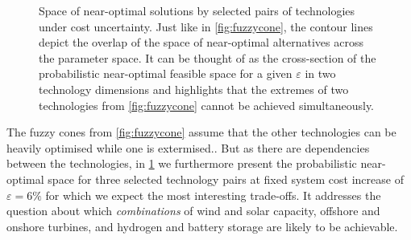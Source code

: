 \begin{figure}
    \noindent{}
    \caption{
      Space of near-optimal solutions by selected pairs of technologies under cost uncertainty.
    Just like in \cref{fig:fuzzycone}, the contour lines depict the overlap of the space of near-optimal alternatives across the parameter space.
    It can be thought of as the cross-section of the probabilistic near-optimal feasible space for a given $\varepsilon$
    in two technology dimensions and highlights that the extremes of two technologies from \cref{fig:fuzzycone} cannot be achieved simultaneously.
    }
    \label{fig:dependencies}
\end{figure}

The fuzzy cones from \cref{fig:fuzzycone} assume that the other technologies can be heavily optimised
while one is extermised..
But as there are dependencies between the technologies, in \cref{fig:dependencies}
we furthermore present the probabilistic near-optimal space for three selected technology
pairs at fixed system cost increase of $\varepsilon=6\%$ for which we expect the most interesting trade-offs.
It addresses the question about which \textit{combinations} of wind and solar capacity,
offshore and onshore turbines, and hydrogen and battery storage are likely to be achievable.

